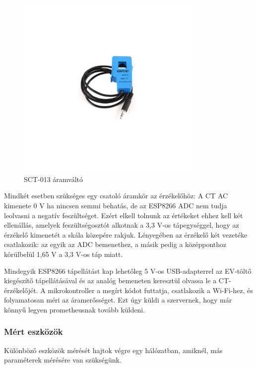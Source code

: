 \begin{figure}[!ht]
    \centering
    \includegraphics[width=0.8\textwidth, keepaspectratio]{figures/CT.jpg}
    \caption{SCT-013 áramváltó \cite{mikroelektronik:sct013}} 
\end{figure}

Mindkét esetben szükséges egy csatoló áramkör az érzékelőhöz: 
A CT AC kimenete 0 V ha nincsen semmi behatás, de az ESP8266 ADC nem tudja leolvasni a negatív feszültséget. 
Ezért elkell tolnunk az értékeket ehhez kell két ellenállás, amelyek feszültségosztót alkotnak 
a 3,3 V-os tápegységgel, hogy az érzékelő kimenetét a skála közepére rakjuk. 
Lényegében az érzékelő két vezetéke csatlakozik: az egyik az ADC bemenethez, 
a másik pedig a középponthoz körülbelül 1,65 V a 3,3 V-os táp miatt.
\cite{openenergymonitor}

Mindegyik ESP8266 tápellátást kap lehetőleg 5 V-os USB-adapterrel az EV-töltő kiegészítő tápellátásával 
és az analóg bemeneten keresztül olvassa le a CT-érzékelőjét.
A mikrokontroller a megírt kódot futtatja, csatlakozik a Wi-Fi-hez, és folyamatosan méri az áramerősséget. 
Ezt úgy küldi a szervernek, hogy már könnyű legyen prometheusnak tovább küldeni.

\subsubsection{Mért eszközök}

Különböző eszközök mérését hajtok végre egy hálózatban, amiknél, más paraméterek mérésére van szükségünk.

